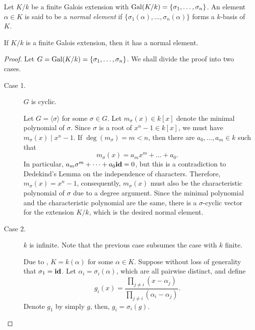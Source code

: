 \begin{definition}
    Let $K/k$ be a finite Galois extension with $\operatorname{Gal}(K/k) = \{\sigma_1,\dots,\sigma_n\}$. An element $\alpha\in K$ is said to be a \emph{normal element} if $\{\sigma_1(\alpha),\dots,\sigma_n(\alpha)\}$ forms a $k$-basis of $K$.
\end{definition}

\begin{theorem}
    If $K/k$ is a finite Galois extension, then it has a normal element.
\end{theorem}
\begin{proof}
    Let $G = \operatorname{Gal}(K/k) = \{\sigma_1,\dots,\sigma_n\}$. We shall divide the proof into two cases.
\begin{description}
    \item[Case 1.] $G$ is cyclic.

    Let $G = \langle\sigma\rangle$ for some $\sigma\in G$. Let $m_\sigma(x)\in k[x]$ denote the minimal polynomial of $\sigma$. Since $\sigma$ is a root of $x^n - 1\in k[x]$, we must have $m_\sigma(x)\mid x^n - 1$. If $\deg(m_\sigma) = m < n$, then there are $a_0,\dots,a_m\in k$ such that 
    \begin{equation*}
        m_\sigma(x) = a_mx^m + \dots + a_0.
    \end{equation*}
    In particular, $a_m\sigma^m + \dots + a_0\mathbf{id} = 0$, but this is a contradiction to Dedekind's Lemma on the independence of characters. Therefore, $m_\sigma(x) = x^n - 1$, consequently, $m_\sigma(x)$ must also be the characteristic polynomial of $\sigma$ due to a degree argument. Since the minimal polynomial and the characteristic polynomial are the same, there is a $\sigma$-cyclic vector for the extension $K/k$, which is the desired normal element.

    \item[Case 2.] $k$ is infinite. Note that the previous case subsumes the case with $k$ finite.

    Due to , $K = k(\alpha)$ for some $\alpha\in K$. Suppose without loss of generality that $\sigma_1 = \mathbf{id}$. Let $\alpha_i = \sigma_i(\alpha)$, which are all pairwise distinct, and define
    \begin{equation*}
        g_i(x) = \frac{\prod_{j\ne i}(x - \alpha_j)}{\prod_{j\ne i}(\alpha_i - \alpha_j)}.
    \end{equation*}
    Denote $g_1$ by simply $g$, then, $g_i = \sigma_i(g)$.


\end{description}
\end{proof}

